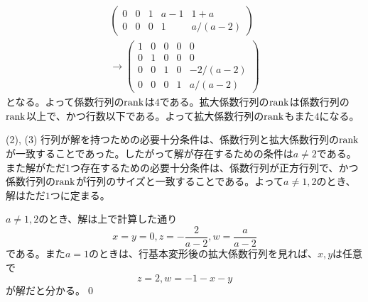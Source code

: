 \begin{itemize}
\begin{align*}
\begin{pmatrix}
0 & 0 & 1 & a - 1 & 1 + a \\
0 & 0 & 0 & 1 & a/(a - 2)
\end{pmatrix}\\
\rightarrow
\begin{pmatrix}
1 & 0 & 0 & 0 & 0 \\
0 & 1 & 0 & 0 & 0 \\
0 & 0 & 1 & 0 & -2/(a - 2) \\
0 & 0 & 0 & 1 & a/(a - 2)
\end{pmatrix}
\end{align*}
となる。よって係数行列の$\operatorname{rank}$は$4$である。拡大係数行列の$\operatorname{rank}$は係数行列の$\operatorname{rank}$以上で、かつ行数以下である。よって拡大係数行列の$\operatorname{rank}$もまた$4$になる。
\end{itemize}

\noindent (2), (3) 行列が解を持つための必要十分条件は、係数行列と拡大係数行列の$\operatorname{rank}$が一致することであった。したがって解が存在するための条件は$a \neq 2$である。また解がただ$1$つ存在するための必要十分条件は、係数行列が正方行列で、かつ係数行列の$\operatorname{rank}$が行列のサイズと一致することである。よって$a \neq 1, 2$のとき、解はただ$1$つに定まる。

$a \neq 1, 2$のとき、解は上で計算した通り
\[
x = y = 0, z = -\frac{2}{a - 2}, w = \frac{a}{a - 2}
\]
である。また$a = 1$のときは、行基本変形後の拡大係数行列を見れば、$x, y$は任意で
\[
z = 2, w = - 1 - x - y
\]
が解だと分かる。\qed

